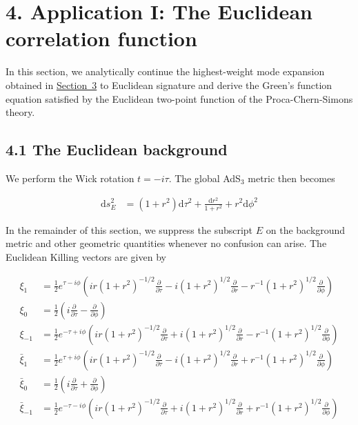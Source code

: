 \section{4. Application I: The Euclidean correlation function}\label{sec:euclidean-correlation-function}

In this section, we analytically continue the highest-weight mode expansion obtained in \hyperref[sec:quantization]{Section~3} to Euclidean signature and derive the Green's function equation satisfied by the Euclidean two-point function of the Proca-Chern-Simons theory.

\subsection{4.1 The Euclidean background}\label{subsec:euclidean-background}

We perform the Wick rotation $t=-i\tau$. The global AdS$_3$ metric then becomes

\begin{align}
\mathrm{d}s^{2}_{E} & =(1+r^{2})\mathrm{d}\tau ^{2}+\frac{\mathrm{d}r^{2}}{1+r^{2}}+r^{2}\mathrm{d}\phi ^{2}
\end{align}

In the remainder of this section, we suppress the subscript $E$ on the background metric and other geometric quantities whenever no confusion can arise. The Euclidean Killing vectors are given by

\begin{align}
\xi _{1} & =\frac{1}{2}e^{\tau-i\phi}\left(ir(1+r^{2})^{-1/2} \frac{\partial}{\partial \tau}-i(1+r^{2})^{1/2} \frac{\partial}{\partial r}-r^{-1}(1+r^{2})^{1/2} \frac{\partial}{\partial \phi}\right) \\
\xi _{0} & =\frac{1}{2}\left(i \frac{\partial}{\partial \tau}-\frac{\partial}{\partial \phi}\right) \\
\xi _{-1} & =\frac{1}{2}e^{-\tau+i\phi}\left(ir(1+r^{2})^{-1/2} \frac{\partial}{\partial \tau}+i(1+r^{2})^{1/2} \frac{\partial}{\partial r}-r^{-1}(1+r^{2})^{1/2} \frac{\partial}{\partial \phi}\right) \\
\bar{\xi}_{1} & =\frac{1}{2}e^{\tau+i\phi}\left(ir(1+r^{2})^{-1/2} \frac{\partial}{\partial \tau}-i(1+r^{2})^{1/2} \frac{\partial}{\partial r}+r^{-1}(1+r^{2})^{1/2} \frac{\partial}{\partial \phi}\right) \\
\bar{\xi}_{0} & =\frac{1}{2}\left(i \frac{\partial}{\partial \tau}+\frac{\partial}{\partial \phi}\right) \\
\bar{\xi}_{-1} & =\frac{1}{2}e^{-\tau-i\phi}\left(ir(1+r^{2})^{-1/2} \frac{\partial}{\partial \tau}+i(1+r^{2})^{1/2} \frac{\partial}{\partial r}+r^{-1}(1+r^{2})^{1/2} \frac{\partial}{\partial \phi}\right)
\end{align}

